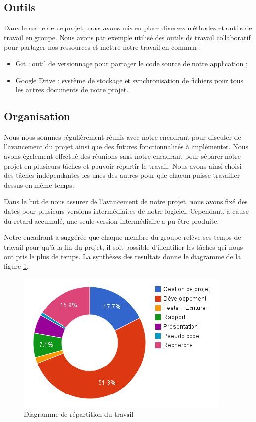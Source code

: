 \subsection{Outils}

Dans le cadre de ce projet, nous avons mis en place diverses méthodes et outils de travail en groupe. Nous avons par exemple utilisé des outils de travail collaboratif pour partager nos ressources et mettre notre travail en commun :
\begin{itemize}
  \item Git : outil de versionnage pour partager le code source de notre application ;
  \item Google Drive : système de stockage et synchronisation de fichiers pour tous les autres documents de notre projet.
\end{itemize}

\subsection{Organisation}

Nous nous sommes régulièrement réunis avec notre encadrant pour discuter de l’avancement du projet ainsi que des futures fonctionnalités à implémenter. Nous avons également effectué des réunions sans notre encadrant pour séparer notre projet en plusieurs tâches et pouvoir répartir le travail. Nous avons ainsi choisi des tâches indépendantes les unes des autres pour que chacun puisse travailler dessus en même temps.

Dans le but de nous assurer de l'avancement de notre projet, nous avons fixé des dates pour plusieurs versions intermédiaires de notre logiciel. Cependant, à cause du retard accumulé, une seule version intermédiaire a pu être produite.

Notre encadrant a suggérée que chaque membre du groupe relève ses temps de travail pour qu'à la fin du projet, il soit possible d'identifier les tâches qui nous ont pris le plus de temps. La synthèses des resultats donne le diagramme de la figure \ref{05-1-work_repartition_chart}.

\begin{figure}
  \begin{center}
  \includegraphics[scale=1]{res/05-1-work_repartition_chart.png}
  \caption{Diagramme de répartition du travail}
  \label{05-1-work_repartition_chart}
  \end{center}
\end{figure}


